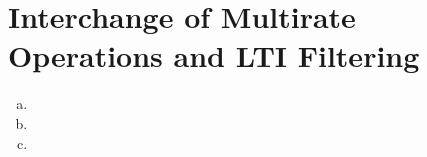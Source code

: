 \section{Interchange of Multirate Operations and LTI Filtering}\label{sec:p7}

\begin{enumerate}[(a)]
	\item 
	\item 
	\item 
\end{enumerate}